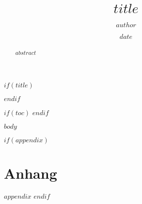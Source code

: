 \documentclass{article}
\begin{document}
$if(title)$
\title{$title$}
\author{$author$}
\date{$date$}
\maketitle
$endif$

\begin{abstract}
$abstract$
\end{abstract}

$if(toc)$
\tableofcontents
\newpage
$endif$

$body$

$if(appendix)$
\appendix
\section*{Anhang}
$appendix$
$endif$
\end{document}
